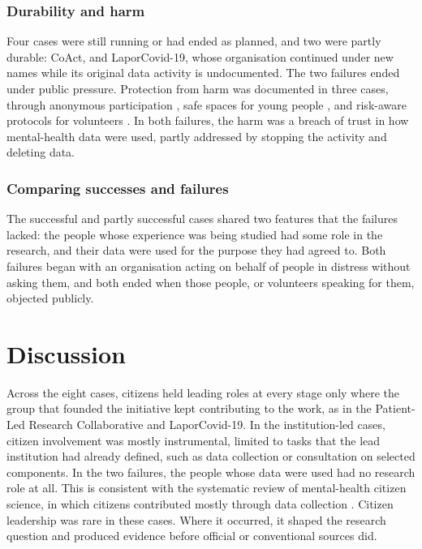 \documentclass[
  number,
  preprint]{elsarticle}
\begin{document}
\subsubsection{Durability and harm}\label{durability-and-harm}

Four cases were still running or had ended as planned, and two were
partly durable: CoAct, and LaporCovid-19, whose organisation continued
under new names while its original data activity is undocumented. The
two failures ended under public pressure. Protection from harm was
documented in three cases, through anonymous participation
\citep{casanovas2026}, safe spaces for young people
\citep{youthgems_earma2024}, and risk-aware protocols for volunteers
\citep{ifrc2021}. In both failures, the harm was a breach of trust in
how mental-health data were used, partly addressed by stopping the
activity and deleting data.

\subsubsection{Comparing successes and
failures}\label{comparing-successes-and-failures}

The successful and partly successful cases shared two features that the
failures lacked: the people whose experience was being studied had some
role in the research, and their data were used for the purpose they had
agreed to. Both failures began with an organisation acting on behalf of
people in distress without asking them, and both ended when those
people, or volunteers speaking for them, objected publicly.

\section{Discussion}\label{sec-discussion}

Across the eight cases, citizens held leading roles at every stage only
where the group that founded the initiative kept contributing to the
work, as in the Patient-Led Research Collaborative and LaporCovid-19. In
the institution-led cases, citizen involvement was mostly instrumental,
limited to tasks that the lead institution had already defined, such as
data collection or consultation on selected components. In the two
failures, the people whose data were used had no research role at all.
This is consistent with the systematic review of mental-health citizen
science, in which citizens contributed mostly through data collection
\citep{todowede2023}. Citizen leadership was rare in these cases. Where
it occurred, it shaped the research question and produced evidence
before official or conventional sources did.
\end{document}
